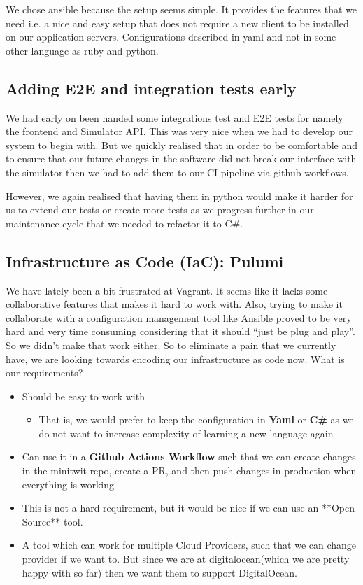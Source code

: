 We chose ansible because the setup seems simple. It provides the features that we need i.e. a nice and easy setup that does not require a new client to be installed on our application servers. Configurations described in yaml and not in some other language as ruby and python.

\subsection{Adding E2E and integration tests early}

We had early on been handed some integrations test and E2E tests for namely the frontend and Simulator API. This was very nice when we had to develop our system to begin with. But we quickly realised that in order to be comfortable and to ensure that our future changes in the software did not break our interface with the simulator then we had to add them to our CI pipeline via github workflows.

However, we again realised that having them in python would make it harder for us to extend our tests or create more tests as we progress further in our maintenance cycle that we needed to refactor it to C\#.

\subsection{Infrastructure as Code (IaC): Pulumi}

We have lately been a bit frustrated at Vagrant. It seems like it lacks some collaborative features that makes it hard to work with. Also, trying to make it collaborate with a configuration management tool like Ansible proved to be very hard and very time consuming considering that it should “just be plug and play”. So we didn’t make that work either. So to eliminate a pain that we currently have, we are looking towards encoding our infrastructure as code now. What is our requirements?

\begin{itemize}
    \item Should be easy to work with
    \begin{itemize}
        \item That is, we would prefer to keep the configuration in \textbf{Yaml} or \textbf{C\#} as we do not want to increase complexity of learning a new language again
    \end{itemize}
    \item Can use it in a \textbf{Github Actions Workflow} such that we can create changes in the minitwit repo, create a PR, and then push changes in production when everything is working
    \item This is not a hard requirement, but it would be nice if we can use an **Open Source** tool.
    \item A tool which can work for multiple Cloud Providers, such that we can change provider if we want to. But since we are at digitalocean(which we are pretty happy with so far) then we want them to support DigitalOcean.
\end{itemize}

